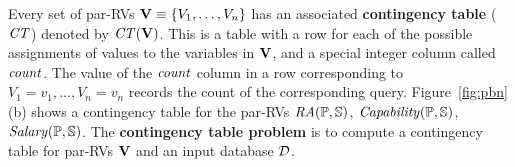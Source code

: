 Every set of par-RVs $\set{V} \equiv \{\V_{1},\ldots,\V_{n} \}$ has an associated \textbf{contingency table} ($\cttable$) denoted by $\cttable(\set{V})$. %
This is a table with a row for each of the possible assignments of values to the variables in $\set{V}$, and a special integer column called $\qcount$. 
The value of the $\qcount$ column in a row 
corresponding to $V_{1} = v_{1},\ldots,V_{n} = v_{n}$ records the count of the 
corresponding query. 
Figure~\ref{fig:pbn}(b) shows a contingency table for the par-RVs $\it{RA}(\P,\S)$, $\it{Capability}(\P,\S)$, $\it{Salary}(\P,\S)$. The \textbf{contingency table problem} is to compute a contingency table for par-RVs $\set{V} $ and an input database $\D$. 
 



